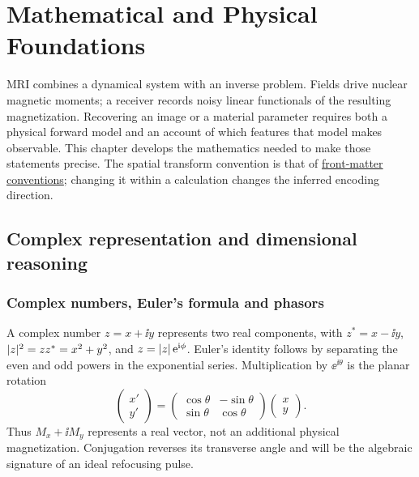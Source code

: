 \chapter{Mathematical and Physical Foundations}
\label{ch:01}

MRI combines a dynamical system with an inverse problem. Fields drive nuclear
magnetic moments; a receiver records noisy linear functionals of the resulting
magnetization. Recovering an image or a material parameter requires both a
physical forward model and an account of which features that model makes
observable. This chapter develops the mathematics needed to make those
statements precise. The spatial transform convention is that of
\hyperref[front:conventions]{front-matter conventions}; changing it within a calculation changes the
inferred encoding direction.

\section{Complex representation and dimensional reasoning}
\label{sec:01:complex-representation-and-dimensional-reasoning}
\subsection{Complex numbers, Euler's formula and phasors}
A complex number $z=x+\ii y$ represents two real components, with
$z^*=x-\ii y$, $\lvert z\rvert^2=zz^*=x^2+y^2$, and
$z=\lvert z\rvert\,\mathrm{e}^{\mathrm{i}\phi}$. Euler's identity follows by separating the even
and odd powers in the exponential series. Multiplication by
$\ee^{\ii\theta}$ is the planar rotation
\[
 \begin{pmatrix}x'\\y'\end{pmatrix}
 =\begin{pmatrix}\cos\theta&-\sin\theta\\
                  \sin\theta&\cos\theta\end{pmatrix}
  \begin{pmatrix}x\\y\end{pmatrix}.
\]
Thus $M_x+\ii M_y$ represents a real vector, not an additional physical
magnetization. Conjugation reverses its transverse angle and will be the
algebraic signature of an ideal refocusing pulse.

